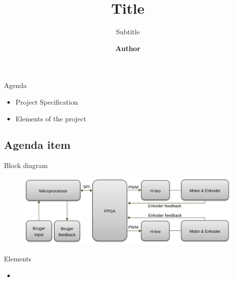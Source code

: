 \documentclass[aspectratio=169,10pt,t]{beamer}
\title{Title}
\subtitle{Subtitle}
\date{ }
\author{
  \textbf{Author}
}
\institute[
  SDU Robotics\\
  The Maersk Mc-Kinney Moller Institute\\
  University of Southern Denmark
] %
{%
  The Maersk Mc-Kinney Moller Institute\\
  University of Southern Denmark

}
\begin{document}

\begin{frame}{Agenda}{\vphantom{(y}}
    \begin{itemize}
        \item Project Specification 
        \item Elements of the project 
    \end{itemize}
\end{frame}



\subsection{Agenda item}
\begin{frame}{Block diagram}{\vphantom{y)}}
\vspace{-0.7em}
\begin{figure}[H]
    \centering
    \includegraphics[width=\textwidth]{blok.png}
\end{figure}
\end{frame}
\begin{frame}{Elements}{\vphantom{y)}}
    \begin{itemize}
        \item
    \end{itemize} 
\end{frame}
\end{document}
